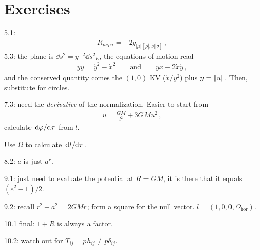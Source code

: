 \documentclass[main.tex]{subfiles}
\begin{document}
\section{Exercises}

5.1: 
%
\begin{align}
R_{\mu \nu \rho \sigma } = - 2 g_{[\mu | [\rho|,\nu ] |\sigma ]}
\,,
\end{align}
%
5.3: the plane is \(\dd{s^2} = y^{-2} \dd{s^2}_{E}\), the equations of motion read 
%
\begin{align}
y \ddot{y} = \dot{y}^2 - \dot{x}^2
\qquad \text{and} \qquad
y \ddot{x} - 2 \dot{x} \dot{y}
\,,
\end{align}
%
and the conserved quantity comes the \((1,0)\) KV (\(\dot{x} / y^2\)) plus \(y = \norm{u}\). Then, substitute for circles.

7.3: need the \emph{derivative} of the normalization. Easier to start from 
%
\begin{align}
u = \frac{GM}{l^2} + 3GM u^2
\,,
\end{align}
calculate \(\dv*{\varphi }{\tau }\) from \(l\). 

Use \(\Omega \) to calculate \(\dv*{t}{\tau }\). 

8.2: \(a\) is just \(a^{r}\).

9.1: just need to evaluate the potential at \(R = GM\), it is there that it equals \((e^2 - 1)/2\).


9.2: recall \(r^2+a^2 = 2GMr\); form a square for the null vector. \(l = (1, 0,0,\Omega _{\text{hor}})\). 

10.1 final: \(1+R\) is always a factor.

10.2: watch out for \(T_{ij} = p h_{ij} \neq p \delta_{ij}\). 
\end{document}
